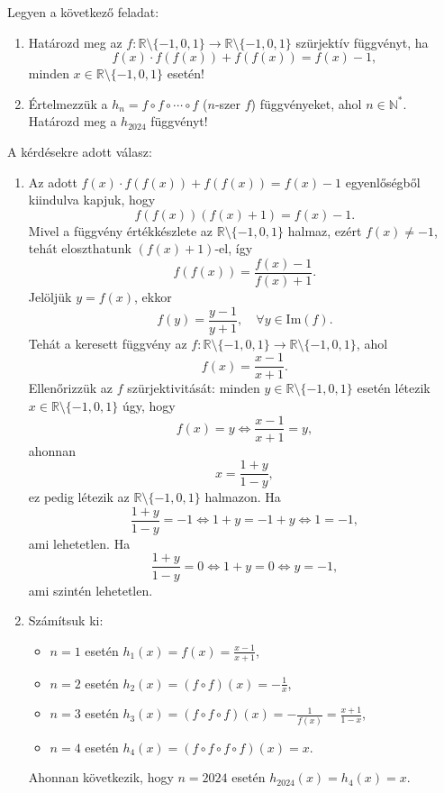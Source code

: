 \begin{extraproblem}
	Legyen a következő feladat:
	\begin{enumerate}
		\item Határozd meg az $f:\mathbb{R}\setminus\{-1,0,1\}\to\mathbb{R}\setminus\{-1,0,1\}$
		szürjektív függvényt, ha 
		\[
		f(x)\cdot f(f(x))+f(f(x))=f(x)-1,
		\]
		minden $x\in\mathbb{R}\setminus\{-1,0,1\}$ esetén!
		\item Értelmezzük a $h_{n}=f\circ f\circ\cdots\circ f$ ($n$-szer $f$)
		függvényeket, ahol $n\in\mathbb{N}^{*}$. Határozd meg a $h_{2024}$
		függvényt! 
	\end{enumerate}
\end{extraproblem}
\begin{solution}
	A kérdésekre adott válasz:
	\begin{enumerate}
		\item Az adott $f(x)\cdot f(f(x))+f(f(x))=f(x)-1$ egyenlőségből kiindulva
		kapjuk, hogy 
		\[
		f(f(x))(f(x)+1)=f(x)-1.
		\]
		Mivel a függvény értékkészlete az $\mathbb{R}\setminus\{-1,0,1\}$
		halmaz, ezért $f(x)\neq-1$, tehát eloszthatunk $(f(x)+1)$-el, így
		\[
		f(f(x))=\frac{f(x)-1}{f(x)+1}.
		\]
		Jelöljük $y=f(x)$, ekkor 
		\[
		f(y)=\frac{y-1}{y+1},\quad\forall y\in\text{Im}(f).
		\]
		Tehát a keresett függvény az $f:\mathbb{R}\setminus\{-1,0,1\}\to\mathbb{R}\setminus\{-1,0,1\}$,
		ahol 
		\[
		f(x)=\frac{x-1}{x+1}.
		\]
		Ellenőrizzük az $f$ szürjektivitását: minden $y\in\mathbb{R}\setminus\{-1,0,1\}$
		esetén létezik $x\in\mathbb{R}\setminus\{-1,0,1\}$ úgy, hogy 
		\[
		f(x)=y\iff\frac{x-1}{x+1}=y,
		\]
		ahonnan 
		\[
		x=\frac{1+y}{1-y},
		\]
		ez pedig létezik az $\mathbb{R}\setminus\{-1,0,1\}$ halmazon. Ha
		\[
		\frac{1+y}{1-y}=-1\iff1+y=-1+y\iff1=-1,
		\]
		ami lehetetlen. Ha 
		\[
		\frac{1+y}{1-y}=0\iff1+y=0\iff y=-1,
		\]
		ami szintén lehetetlen.
		\item Számítsuk ki: 
		\begin{itemize}
			\item $n=1$ esetén $h_{1}(x)=f(x)=\frac{x-1}{x+1}$, 
			\item $n=2$ esetén $h_{2}(x)=(f\circ f)(x)=-\frac{1}{x}$, 
			\item $n=3$ esetén $h_{3}(x)=(f\circ f\circ f)(x)=-\frac{1}{f(x)}=\frac{x+1}{1-x}$, 
			\item $n=4$ esetén $h_{4}(x)=(f\circ f\circ f\circ f)(x)=x$. 
		\end{itemize}
		Ahonnan következik, hogy $n=2024$ esetén $h_{2024}(x)=h_{4}(x)=x$. 
		
	\end{enumerate}
\end{solution}
